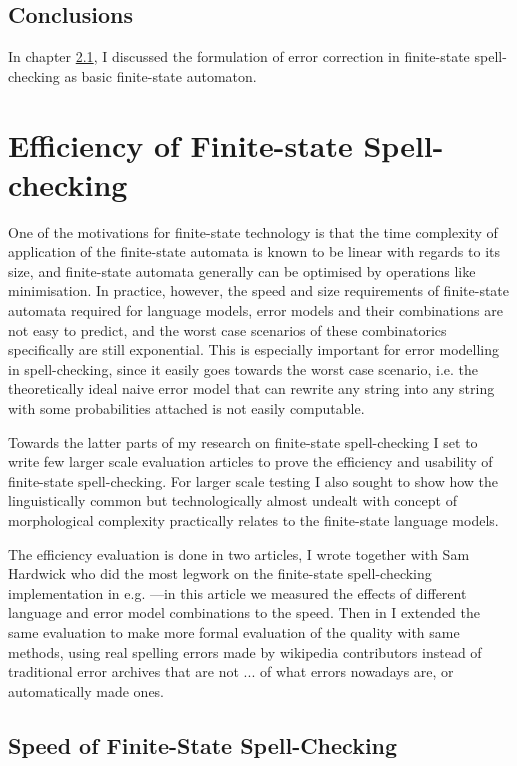\documentclass[officiallayout,draft]{unihelcompling}
\begin{document}
\section{Conclusions}

In chapter \ref{}, I discussed the formulation of error correction in 
finite-state spell-checking as basic finite-state automaton. 

\chapter{Efficiency of Finite-state Spell-checking}
\label{chap:efficiency}

One of the motivations for finite-state technology is that the time complexity
of application of the finite-state automata is known to be linear with regards
to its size, and finite-state automata generally can be optimised by operations
like minimisation. In practice, however, the speed and size requirements of
finite-state automata required for language models, error models and their
combinations are not easy to predict, and the worst case scenarios of these
combinatorics specifically are still exponential. This is especially important
for error modelling in spell-checking, since it easily goes towards the worst
case scenario, i.e. the theoretically ideal naive error model that can rewrite
any string into any string with some probabilities attached is not easily
computable.

Towards the latter parts of my research on finite-state spell-checking I set to
write few larger scale evaluation articles to prove the efficiency and
usability of finite-state spell-checking. For larger scale testing I also
sought to show how the linguistically common but technologically almost
undealt with concept of morphological complexity practically relates to the
finite-state language models.

The efficiency evaluation is done in two articles, \cite{} I wrote together
with Sam Hardwick who did the most legwork on the finite-state spell-checking
implementation in e.g. \cite{}---in this article we measured the effects
of different language and error model combinations to the speed. Then in
\cite{} I extended the same evaluation to make more formal evaluation of the
quality with same methods, using real spelling errors made by wikipedia
contributors instead of traditional error archives that are not ... of what
errors nowadays are, or automatically made ones.

\section{Speed of Finite-State Spell-Checking}
\end{document}
